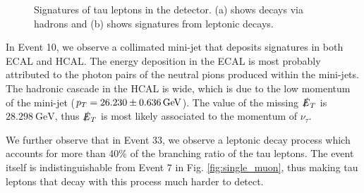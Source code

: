 \documentclass[a4paper]{report}
\numberwithin{equation}{section}
\begin{document}
\begin{figure}[htb!]
	\centering
	\quad
	\centering
	\caption{Signatures of tau leptons in the detector. (a) shows decays via hadrons and (b) shows signatures from leptonic decays.}
	\label{fig:single_tau}
\end{figure}

In Event 10, we observe a collimated mini-jet that deposits signatures in both ECAL and HCAL. The energy deposition in the ECAL is 
most probably attributed to the photon pairs of the neutral pions produced within the mini-jets. The hadronic cascade in the HCAL is 
wide, which is due to the low momentum of the mini-jet ($ p_T = \SI{26.23 \pm 0.636}{\giga\electronvolt}$). The value of the missing 
$\slashed{E}_T$ is $\SI{ 28.298}{\giga\electronvolt}$, thus $\slashed{E}_T$ is most likely associated to the momentum of $\nu_\tau$. \par 

We further observe that in Event 33, we observe a leptonic decay process which accounts for more than 40\% of the branching ratio of 
the tau leptons. The event itself is indistinguishable from Event 7 in Fig. \ref{fig:single_muon}, thus making tau leptons that decay 
with this process much harder to detect. 
\end{document}
